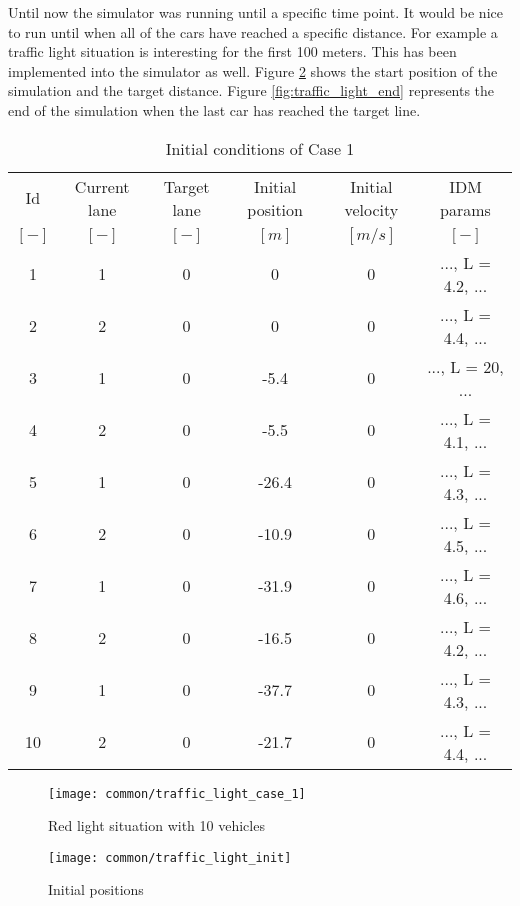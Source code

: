 		Until now the simulator was running until a specific time point. It would be nice to run until when all of the cars have reached a specific distance. For example a traffic light situation is interesting for the first 100 meters. This has been implemented into the simulator as well. Figure \ref{fig:traffic_light_init} shows the start position of the simulation and the target distance. Figure \ref{fig:traffic_light_end} represents the end of the simulation when the last car has reached the target line.
		\begin{table}
			\begin{center}
				\begin{tabular}{ |c|c|c|c|c|c| }
					\hline
					Id & Current lane & Target lane & Initial position & Initial velocity& IDM params\\
					$[-]$ & $[-]$ & $[-]$ & $[m]$ & $[m/s]$ & $[-]$\\
					\hline
					1 & 1 & 0 & 0 & 0 & ..., L = 4.2, ... \\
					2 & 2 & 0 & 0 & 0 & ..., L = 4.4, ... \\
					3 & 1 & 0 & -5.4 & 0 & ..., L = 20, ... \\
					4 & 2 & 0 & -5.5 & 0 & ..., L = 4.1, ... \\
					5 & 1 & 0 & -26.4 & 0 & ..., L = 4.3, ... \\
					6 & 2 & 0 & -10.9 & 0 & ..., L = 4.5, ... \\
					7 & 1 & 0 & -31.9 & 0 & ..., L = 4.6, ... \\
					8 & 2 & 0 & -16.5 & 0 & ..., L = 4.2, ... \\
					9 & 1 & 0 & -37.7 & 0 & ..., L = 4.3, ... \\
					10 & 2 & 0 & -21.7 & 0 & ..., L = 4.4, ... \\
					\hline
				\end{tabular}
			\end{center}
			\caption{Initial conditions of Case 1}
			\label{tab:case_1_definition_array}
		\end{table}
		\begin{figure}
			\centering
			\texttt{[image: common/traffic\_light\_case\_1]}
			\caption{Red light situation with 10 vehicles}
			\label{fig:red_light_situation}
		\end{figure}
		\begin{figure}
			\centering
			\texttt{[image: common/traffic\_light\_init]}
			\caption{Initial positions}
			\label{fig:traffic_light_init}
		\end{figure}
